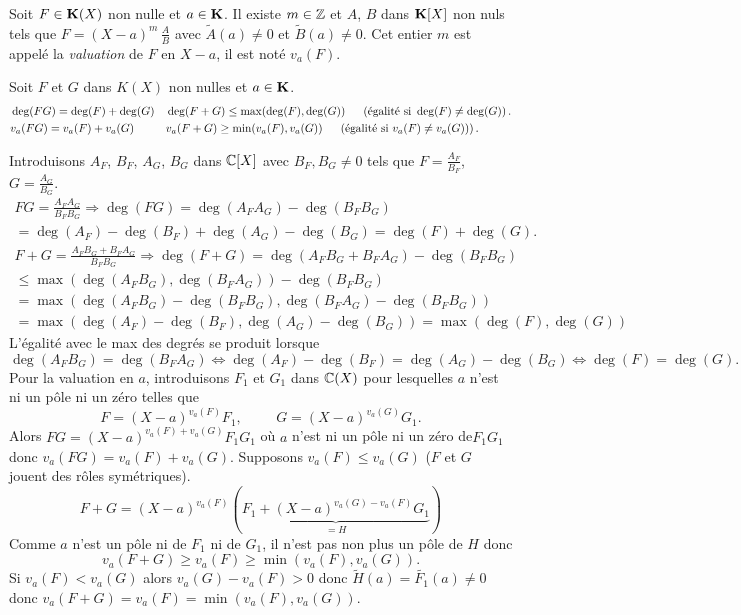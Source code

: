 \begin{defi}
  Soit $F\in \mathbf{K}(X)$ non nulle et $a\in \mathbf{K}$. Il existe $m \in \mathbb{Z}$ et $A$, $B$ dans $\mathbf{K}[X]$ non nuls tels que $F = (X-a)^m \,\frac{A}{B}$ avec $\widetilde{A}(a) \neq 0$ et $\widetilde{B}(a) \neq 0$. Cet entier $m$ est appelé la \emph{valuation} de $F$ en $X-a$, il est noté $v_a(F)$.
\end{defi}

\begin{prop}
 Soit $F$ et $G$ dans $K(X)$ non nulles et $a \in \mathbf{K}$.
\begin{align*}
 &\deg(FG)=\deg(F)+\deg(G) & &\deg(F+G)\leq \max(\deg(F),\deg(G))  \hspace{0.5cm}\left( \text{égalité si } \deg(F) \neq \deg(G)\right). \\
 &v_a(FG)=v_a(F)+v_a(G) & &v_a(F+G)\geq \min(v_a(F),v_a(G)) \hspace{0.5cm}\left( \text{égalité si } v_a(F) \neq v_a(G))\right) .
\end{align*}
\end{prop}
\begin{demo}
 Introduisons $A_F$, $B_F$, $A_G$, $B_G$ dans $\mathbb{C}[X]$ avec $B_F, B_G \neq 0$ tels que $F = \frac{A_F}{B_F}$, $G = \frac{A_G}{B_G}$.
\begin{multline*}
F G = \frac{A_F A_G }{B_F B_G}
\Rightarrow \deg(FG) = \deg(A_F A_G )-\deg(B_F B_G) \\
= \deg(A_F)-\deg(B_F) + \deg(A_G )-\deg(B_G)
= \deg(F) + \deg(G).
\end{multline*}
\begin{multline*}
F + G = \frac{A_F B_G + B_F A_G}{B_F B_G}
\Rightarrow \deg(F + G) = \deg(A_F B_G + B_F A_G)-\deg(B_F B_G) \\
\leq \max\left( \deg(A_F B_G), \deg(B_F A_G)\right) - \deg(B_F B_G)\\
= \max\left( \deg(A_F B_G)  - \deg(B_F B_G), \deg(B_F A_G)  - \deg(B_F B_G)\right)\\
= \max\left( \deg(A_F)  - \deg(B_F), \deg(A_G)  - \deg(B_G)\right)
= \max\left( \deg(F), \deg(G)\right)
\end{multline*}
L'égalité avec le max des degrés se produit lorsque 
\[
 \deg(A_F B_G) = \deg(B_F A_G) \Leftrightarrow \deg(A_F) - \deg(B_F) = \deg(A_G) - \deg(B_G) \Leftrightarrow \deg(F) = \deg(G).
\]
Pour la valuation en $a$, introduisons $F_1$ et $G_1$ dans $\mathbb{C}(X)$ pour lesquelles $a$ n'est ni un pôle ni un zéro telles que 
\[
 F=(X-a)^{v_a(F)}F_1, \hspace{1cm} G=(X-a)^{v_a(G)}G_1.
\]
Alors $FG = (X-a)^{v_a(F)+v_a(G)}F_1G_1$ où $a$ n'est ni un pôle ni un zéro de$F_1G_1$ donc $v_a(FG) = v_a(F) + v_a(G)$.
Supposons $v_a(F) \leq v_a(G)$ ($F$ et $G$ jouent des rôles symétriques). 
\[
 F + G 
 = (X-a)^{v_a(F)}\left( \underset{ = H}{\underbrace{F_1 + (X-a)^{v_a(G) - v_a(F)}G_1}}\right) 
\]
Comme $a$ n'est un pôle ni de $F_1$ ni de $G_1$, il n'est pas non plus un pôle de $H$ donc 
\[
 v_a(F+G)\geq v_a(F) \geq \min(v_a(F),v_a(G)).
\]
Si $v_a(F) < v_a(G)$ alors $v_a(G) - v_a(F) >0$ donc $\widetilde{H}(a) = \widetilde{F_1}(a) \neq 0$ donc $v_a(F+G) = v_a(F) = \min(v_a(F),v_a(G))$.
\end{demo}

